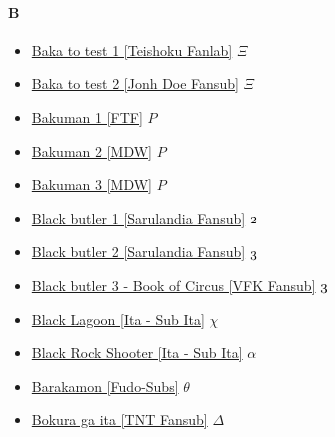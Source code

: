 		\paragraph{B} \hypertarget{SB}{}
			\begin{itemize}
				\item \href{https://mega.nz/#F!AbBmjJCb!HGyWjng0xnj8iilc1PwKFg} {Baka to test 1 [Teishoku Fanlab]}  $\Xi$ \\ 
				\item \href{https://mega.nz/#F!BGI2XTLJ!pHXc9q50FXh8PaMy10ljHg} {Baka to test 2 [Jonh Doe Fansub]}  $\Xi$ \\ 
				\item \href{https://mega.nz/#F!saIGgLCR!_F9EuREWDNrIWHMe2NeLHQ} {Bakuman 1 [FTF]}  $P$ \\ 
				\item \href{https://mega.nz/#F!4KxDDaqZ!5TTQYNb4YW26M6HdVNmoIQ} {Bakuman 2 [MDW]}  $P$ \\ 
				\item \href{https://mega.nz/#F!ZWo0gDiD!Dv60i7KnOtmc7QRTZ5vyXg} {Bakuman 3 [MDW]}  $P$ \\ 
				\item \href{https://mega.nz/#F!iXpXzCpR!ZP5cE32VHkErX_VHLCYr4Q} {Black butler 1 [Sarulandia Fansub]}  $\oldstylenums{2}$ \\ 	
				\item \href{https://mega.nz/#F!WehGyZiJ!WtLGB5-liGCMRUi5nDnGAw} {Black butler 2 [Sarulandia Fansub]}  $\oldstylenums{3}$ \\ 
				\item \href{https://mega.nz/#F!ieQAESwR!i-KKCTIXMLP2305EM4IM9Q} {Black butler 3 - Book of Circus [VFK Fansub]}  $\oldstylenums{3}$ \\ 		
				\item \href{https://mega.nz/#F!XpEDVJTa!sdvXj_oS6QvdBkDX8Z-1FQ} {Black Lagoon [Ita - Sub Ita]}  $\chi$ \\ 	
				\item \href{https://mega.nz/#F!1AlmUAZR!8xUQ1Ynx0nBkB-GZPeJWrg} {Black Rock Shooter [Ita - Sub Ita]}  $\alpha$ \\ 
				\item \href{https://mega.nz/#F!NlUlhBSQ!9avbUS4Zb2I_NzSCwrxdXA} {Barakamon [Fudo-Subs]}  $\theta$ \\ 
				\item \href{https://mega.nz/#F!RzYxSbjJ!e3WDPyAbcQv07gJhZ_AMRQ} {Bokura ga ita [TNT Fansub]}  $\varDelta$ \\ 
			
			\end{itemize}	
			
